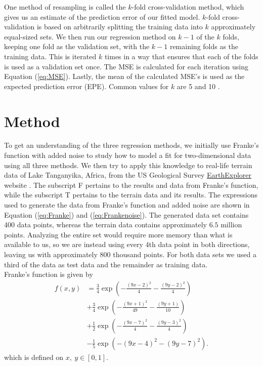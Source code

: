 \documentclass[a4paper, 10pt]{article}
\begin{document}
\begin{multicols}{2}
One method of resampling is called the $k$-fold cross-validation method, which gives us an estimate of the prediction error of our fitted model. $k$-fold cross-validation is based on arbitrarily splitting the training data into $k$ approximately equal-sized sets.  We then run our regression method on $k-1$ of the $k$ folds, keeping one fold as the validation set, with the $k-1$ remaining folds as the training data. This is iterated $k$ times in a way that ensures that each of the folds is used as a validation set once. The MSE is calculated for each iteration using Equation (\ref{eq:MSE}). Lastly, the mean of the calculated MSE's is used as the expected prediction error (EPE).  Common values for $k$ are 5 and 10 \cite{hastie}.


\section{Method}
To get an understanding of the three regression methods, we initially use Franke's function with added noise to study how to model a fit for two-dimensional data using all three methods. We then try to apply this knowledge to real-life terrain data of Lake Tanganyika, Africa, from the US Geological Survey \href{https://earthexplorer.usgs.gov/}{EarthExplorer}  website \cite{earthexplorer} .  The subscript F pertains to the results and data from Franke's function, while the subscript T pertains to the terrain data and its results.  The expressions used to generate the data from Franke's function and added noise are shown in Equation (\ref{eq:Franke}) and (\ref{eq:Frankenoise}). The generated data set contains 400 data points, whereas the terrain data contains approximately $6.5$ million points. Analyzing the entire set would require more memory than what is available to us, so we are instead using every 4th data point in both directions, leaving us with approximately 800 thousand points.  For both data sets we used a third of the data as test data and the remainder as training data.
\\
Franke's function \cite{franke1979critical} is given by
\begin{align}
f(x,y) &= \frac{3}{4}\exp{\left(-\frac{(9x-2)^2}{4}   - \frac{(9y-2)^2}{4}\right)} \nonumber\\
 &+\frac{3}{4}\exp{\left(-\frac{(9x+1)^2}{49}- \frac{(9y+1)}{10}\right)} \nonumber\\
 &+\frac{1}{2}\exp{\left(-\frac{(9x-7)^2}{4} - \frac{(9y-3)^2}{4}\right)} \nonumber\\
 &-\frac{1}{5}\exp{\left(-(9x-4)^2 - (9y-7)^2\right) } . \label{eq:Franke}
\end{align} which is defined on $x,\ y \in [0,1]$. 


\end{multicols}
\end{document}
